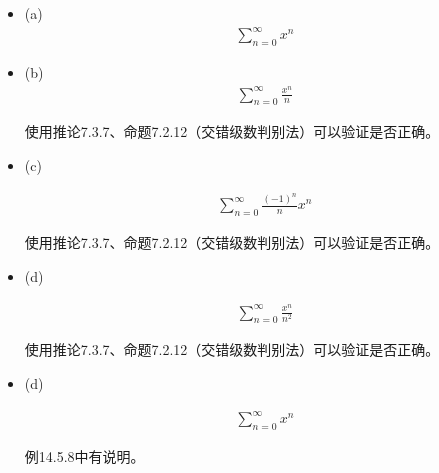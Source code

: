 \documentclass{article}
\begin{document}
\begin{itemize}
  \item (a)
        \begin{align*}
          \sum\limits_{n = 0}^\infty x^n
        \end{align*}

  \item (b)
        \begin{align*}
          \sum\limits_{n = 0}^\infty \frac{x^n}{n}
        \end{align*}

        使用推论7.3.7、命题7.2.12（交错级数判别法）可以验证是否正确。

  \item (c)

        \begin{align*}
          \sum\limits_{n = 0}^\infty \frac{(-1)^n}{n} x^n
        \end{align*}

        使用推论7.3.7、命题7.2.12（交错级数判别法）可以验证是否正确。

  \item (d)

        \begin{align*}
          \sum\limits_{n = 0}^\infty \frac{x^n}{n^2}
        \end{align*}

        使用推论7.3.7、命题7.2.12（交错级数判别法）可以验证是否正确。

  \item (d)

        \begin{align*}
          \sum\limits_{n = 0}^\infty x^n
        \end{align*}

        例14.5.8中有说明。

\end{itemize}
\end{document}
